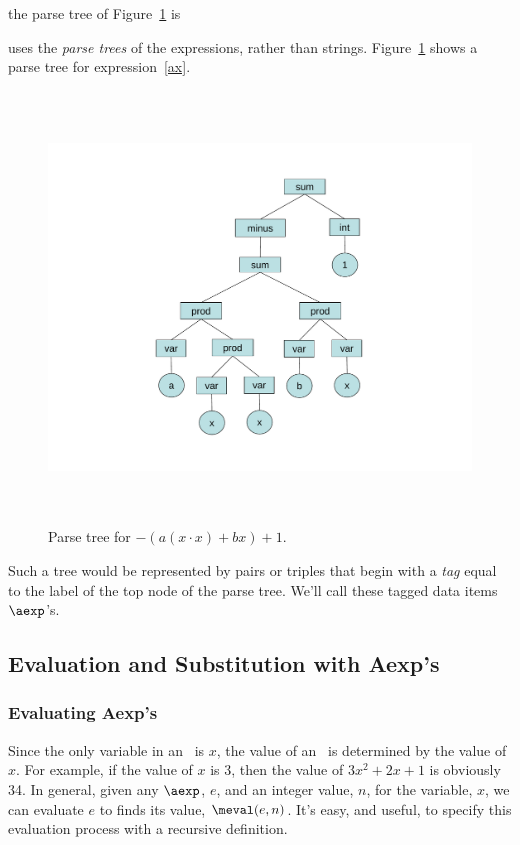 \begin{definition}
the parse tree of Figure~\ref{fig:parse} is

uses the \emph{parse trees} of the expressions,
rather than strings.  Figure~\ref{fig:parse} shows a
parse tree for expression~\eqref{ax}.

\begin{figure}[htbp]
\centering \includegraphics[height=4.5in]{figures/parsetree.pdf}
\caption{Parse tree for $-(a(x\cdot x)+ bx) + 1$.}
\label{fig:parse}
\end{figure}


Such a tree would be represented by pairs or triples that begin with a
\emph{tag} equal to the label of the top node of the parse tree.  We'll
call these tagged data items $\aexp$'s.  
\fi


\subsection{Evaluation and Substitution with Aexp's}

\subsubsection{Evaluating Aexp's}

Since the only variable in an \aexp\ is $x$, the value of an \aexp\ is
determined by the value of $x$.  For example, if the value of $x$ is 3,
then the value of $3x^2 + 2x + 1$ is obviously 34.  In general, given any
$\aexp$, $e$, and an integer value, $n$, for the variable, $x$, we can
evaluate $e$ to finds its value, $\meval(e,n)$.  It's easy, and useful, to
specify this evaluation process with a recursive definition.


\end{definition}
